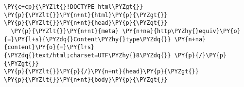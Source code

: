 \begin{Verbatim}[commandchars=\\\{\}]
\PY{c+cp}{\PYZlt{}!DOCTYPE html\PYZgt{}}
\PY{p}{\PYZlt{}}\PY{n+nt}{html}\PY{p}{\PYZgt{}}
\PY{p}{\PYZlt{}}\PY{n+nt}{head}\PY{p}{\PYZgt{}}
  \PY{p}{\PYZlt{}}\PY{n+nt}{meta} \PY{n+na}{http\PYZhy{}equiv}\PY{o}{=}\PY{l+s}{\PYZdq{}Content\PYZhy{}type\PYZdq{}} \PY{n+na}{content}\PY{o}{=}\PY{l+s}{\PYZdq{}text/html;charset=UTF\PYZhy{}8\PYZdq{}} \PY{p}{/}\PY{p}{\PYZgt{}}
\PY{p}{\PYZlt{}}\PY{p}{/}\PY{n+nt}{head}\PY{p}{\PYZgt{}}
\PY{p}{\PYZlt{}}\PY{n+nt}{body}\PY{p}{\PYZgt{}}
\end{Verbatim}
